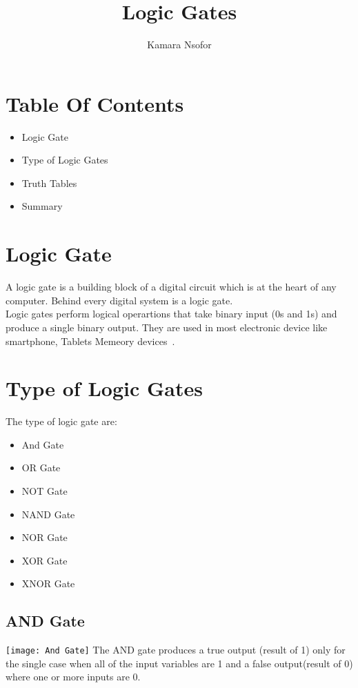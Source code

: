 \documentclass{article}
\begin{document}
	\title{Logic Gates}
	\author{Kamara Nsofor}

	
	
\maketitle
\newpage
\section{Table Of Contents}
	
	\begin{itemize}
		\item Logic Gate
		\item Type of Logic Gates
		\item Truth Tables
		\item Summary		
	\end{itemize}
	
	
\newpage
\section{Logic Gate}
	A logic gate is a building block of a digital circuit which is at the heart of any computer. Behind every digital system is a logic gate.\\
	Logic gates perform logical operartions that take binary input (0s and 1s) and produce a single binary output. They are used in most electronic device like smartphone, Tablets Memeory devices~\cite{}.
	
\section{Type of Logic Gates}
		The type of logic gate are:
		\begin{itemize}
			\item And Gate
			\item OR Gate
			\item NOT Gate
			\item NAND Gate
			\item NOR Gate
			\item XOR Gate
			\item XNOR Gate
		\end{itemize}
	
\subsection{AND Gate}
\texttt{[image: And Gate]}%
The AND gate produces a true output (result of 1) only for the single case when all of the input variables are 1 and a false output(result of 0) where one or more inputs are 0.
\end{document}
